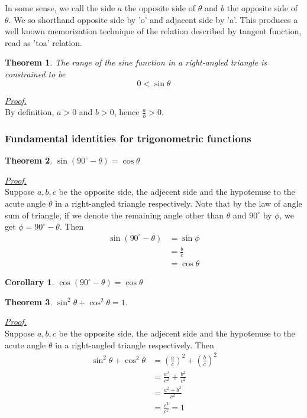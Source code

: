 \documentclass[12pt]{article}
\newtheorem*{theorem}{Theorem}
\newtheorem*{corollary}{Corollary}
\renewenvironment{proof}[1][Proof]{\begin{snugshade*} \underline{\textit{{#1}.}}\\}{\hfill \qedsymbol \end{snugshade*}}
\begin{document}
    In some sense, we call the side $a$ the opposite side of $\theta$ and $b$ the opposite side of $\theta$. We so shorthand opposite side by 'o' and adjacent side by 'a'. This produces a well known memorization technique of the relation described by tangent function, read as 'toa' relation.

    \begin{theorem}
        The range of the sine function in a right-angled triangle is constrained to be $$0<\sin{\theta}$$
    \end{theorem}

    \begin{proof}
        By definition, $a>0$ and $b>0$, hence $\frac{a}{b}>0$.
    \end{proof}

    \subsubsection*{Fundamental identities for trigonometric functions}

    \begin{theorem}
        $\sin(90^\circ - \theta)=\cos{\theta}$
    \end{theorem}

    \begin{proof}
        Suppose $a,b,c$ be the opposite side, the adjecent side and the hypotenuse to the acute angle $\theta$ in a right-angled triangle respectively. Note that by the law of angle sum of triangle, if we denote the remaining angle other than $\theta$ and $90^\circ$ by $\phi$, we get $\phi = 90^\circ - \theta$. Then \begin{align*}
            \sin(90^\circ - \theta) &= \sin{\phi}\\
            &= \frac{b}{c}\\
            &= \cos{\theta}
        \end{align*}
    \end{proof}

    \begin{corollary}
        $\cos(90^\circ - \theta)=\cos{\theta}$
    \end{corollary}

    \begin{theorem}
        $\sin^2{\theta}+\cos^2{\theta}=1$.
    \end{theorem}

    \begin{proof}
        Suppose $a,b,c$ be the opposite side, the adjecent side and the hypotenuse to the acute angle $\theta$ in a right-angled triangle respectively. Then \begin{align*}
            \sin^2{\theta}+\cos^2{\theta}&=(\frac{a}{c})^2+(\frac{b}{c})^2\\
            &=\frac{a^2}{c^2}+\frac{b^2}{c^2}\\
            &=\frac{a^2+b^2}{c^2}\\
            &=\frac{c^2}{c^2}=1
        \end{align*}
    \end{proof}
\end{document}
